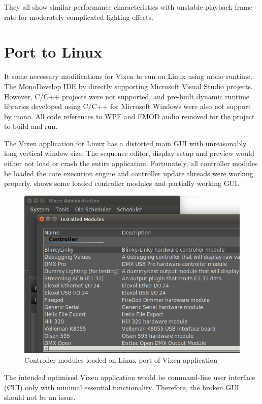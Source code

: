  They all show similar performance characteristics with unstable playback frame rate for moderately complicated lighting effects.

\section{Port to Linux}

It  some necessary modifications for Vixen to run on Linux using mono runtime. The MonoDevelop IDE \cite{monodevelop}  by directly supporting Microsoft Visual Studio projects. However, C/C++ projects were not supported, and pre-built dynamic runtime libraries developed using C/C++ for Microsoft Windows were also not support by mono. All code references to WPF and FMOD audio  removed for the project to build and run.

The  Vixen application for Linux has a distorted main GUI with unreasonably long vertical window size. The sequence editor, display setup and preview would either not load or crash the entire application. Fortunately, all controller modules  be loaded\ca{;} the core execution engine and controller update threads were  working properly.  shows some loaded controller modules and partially working GUI.

\begin{figure}[t]
  \centering
  \includegraphics[width=0.8\columnwidth]{Figs/vixen_linux_controllers.png}
  \caption{\footnotesize Controller modules loaded on Linux port of Vixen application}
  \label{fig:vixen_linux_main}
\end{figure}

The intended optimised Vixen application would be command-line user interface (CUI) only with minimal essential functionality. Therefore, the broken GUI should not be an issue.

